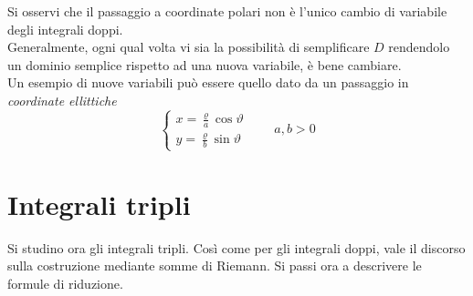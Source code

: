\vspace*{6pt}
\begin{oss}
    Si osservi che il passaggio a coordinate polari non è l'unico cambio di variabile degli integrali doppi.\\
    Generalmente, ogni qual volta vi sia la possibilità di semplificare $D$ rendendolo un dominio semplice rispetto ad una nuova variabile, è bene cambiare.\\ 
    Un esempio di nuove variabili può essere quello dato da un passaggio in \textit{coordinate ellittiche}
    \begin{equation}
        \begin{cases}
            x=\frac{\varrho}{a} \cos \vartheta\\
            y=\frac{\varrho}{b}\sin\vartheta
        \end{cases} \qquad a,b >0
    \end{equation}
\end{oss}
\section{Integrali tripli}
Si studino ora gli integrali tripli. Così come per gli integrali doppi, vale il discorso sulla costruzione mediante somme di Riemann. 
Si passi ora a descrivere le formule di riduzione.
